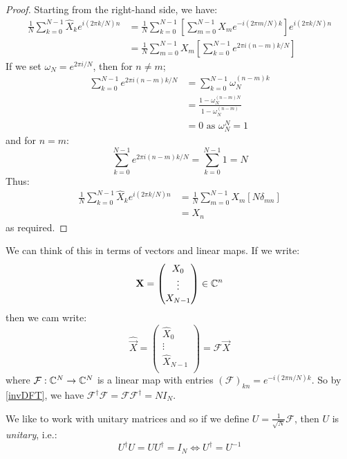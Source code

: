 \documentclass[../main.tex]{subfiles}
\begin{document}
\begin{proof}
  Starting from the right-hand side, we have:
  \begin{align*}
    \frac{1}{N} \sum_{k = 0}^{N - 1} \hat{X}_k e^{i(2 \pi k/N)n} &= \frac{1}{N} \sum_{k = 0}^{N - 1} \left[\sum_{m = 0}^{N - 1} X_m e^{-i(2 \pi m/N)k}\right]e^{i(2\pi k/N)n} \\
                                                                 &= \frac{1}{N} \sum_{m = 0}^{N - 1} X_m \left[\sum_{k = 0}^{N - 1} e^{2 \pi i(n - m)k/N}\right]
  \end{align*}
  If we set $\omega_N = e^{2\pi i/N}$, then for $n \neq m$;
  \begin{align*}
    \sum_{k = 0}^{N - 1} e^{2 \pi i(n - m)k/N} &= \sum_{k = 0}^{N - 1} \omega^{(n - m)k}_N \\
                                               &= \frac{1 - \omega^{(n - m)N}_N}{1 - \omega^{(n - m)}_N} \\
                                               &= 0 \text{ as $\omega^{N}_N = 1$}
  \end{align*}
  and for $n = m$:
  \[
    \sum_{k = 0}^{N - 1} e^{2 \pi i(n - m)k/N} = \sum_{k = 0}^{N - 1} 1 = N
  \]
  Thus:
  \begin{align*}
    \frac{1}{N} \sum_{k = 0}^{N - 1} \hat{X}_k e^{i(2 \pi k/N)n} &= \frac{1}{N}\sum_{m = 0}^{N - 1} X_m [N \delta_{m n}] \\
                                                                 &= X_n
  \end{align*}
  as required.
\end{proof}
\begin{remark}
  We can think of this in terms of vectors and linear maps.
  If we write:
  \[
    \mathbf{\bm{X}} = \begin{pmatrix}
    X_0 \\
    \vdots \\
    X_{N - 1} \\
    \end{pmatrix} \in \mathbb{C}^{n}
  \]
  then we cam write:
  \[
    \hat{\vec{X}} = \begin{pmatrix}
    \hat{X}_0 \\
    \vdots \\
    \hat{X}_{N - 1} \\
    \end{pmatrix} = \mathcal{F}\vec{X}
  \]
  where $\mathcal{F}: \mathbb{C}^{N} \to \mathbb{C}^{N}$ is a linear map with entries $(\mathcal{F})_{k n} = e^{-i(2\pi n/N)k}$.
  So by \cref{invDFT}, we have $\mathcal{F}^{\dag} \mathcal{F} = \mathcal{F}\mathcal{F}^{\dag} = NI_N$.

  We like to work with unitary matrices and so if we define $U = \frac{1}{\sqrt{N}} \mathcal{F}$, then $U$ is \textit{unitary}, i.e.:
  \[
    U^{\dag}U = UU^{\dag} = I_N \iff U^{\dag} = U^{-1}
  \]
\end{remark}
\end{document}
